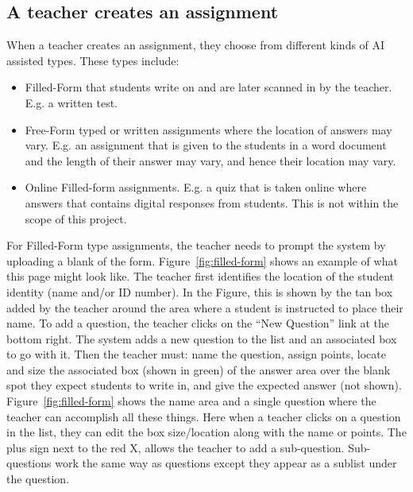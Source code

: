 \documentclass[ms,twoside,print]{nuthesis}
\begin{document}
\subsection{A teacher creates an assignment}

When a teacher creates an assignment, they choose from different kinds of AI assisted types. These types include:

\begin{itemize}
    \item Filled-Form that students write on and are later scanned in by the teacher. E.g. a written test. 
    \item Free-Form typed or written assignments where the location of answers may vary. E.g. an assignment that is given to the students in a word document and the length of their answer may vary, and hence their location may vary.
    \item Online Filled-form assignments. E.g. a quiz that is taken online where answers that contains digital responses from students. This is not within the scope of this project.
\end{itemize}

For Filled-Form type assignments, the teacher needs to prompt the system by uploading a blank of the form. Figure~\ref{fig:filled-form} shows an example of what this page might look like. The teacher first identifies the location of the student identity (name and/or ID number). In the Figure, this is shown by the tan box added by the teacher around the area where a student is instructed to place their name. To add a question, the teacher clicks on the ``New Question'' link at the bottom right. The system adds a new question to the list and an associated box to go with it. Then the teacher must: name the question, assign points, locate and size the associated box (shown in green) of the answer area over the blank spot they expect students to write in, and give the expected answer (not shown). Figure~\ref{fig:filled-form} shows the name area and a single question where the teacher can accomplish all these things. Here when a teacher clicks on a question in the list, they can edit the box size/location along with the name or points. The plus sign next to the red X, allows the teacher to add a sub-question. Sub-questions work the same way as questions except they appear as a sublist under the question.
\end{document}
